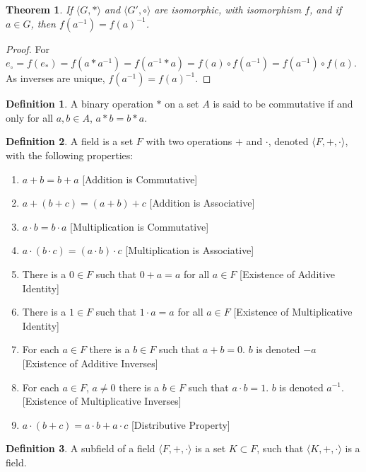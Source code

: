 \documentclass[oneside]{book}
\newtheorem{theorem}{Theorem}[section]
\theoremstyle{definition}
\newtheorem{definition}{Definition}[section]
\begin{document}
\begin{theorem}
If $\langle G, * \rangle$ and $\langle G', \circ \rangle$ are isomorphic, with isomorphism $f$, and if $a\in G$, then $f(a^{-1}) = f(a)^{-1}$.
\end{theorem}
\begin{proof}
For $e_{\circ}=f(e_*) = f(a*a^{-1}) = f(a^{-1}*a) = f(a)\circ f(a^{-1})=f(a^{-1})\circ f(a)$. As inverses are unique, $f(a^{-1})=f(a)^{-1}$.
\end{proof}

\begin{definition}
A binary operation $*$ on a set $A$ is said to be commutative if and only for all $a,b\in A$, $a*b = b*a$.
\end{definition}

\begin{definition}
A field is a set $F$ with two operations $+$ and $\cdot$, denoted $\langle F, +,\cdot \rangle$, with the following properties:
\begin{enumerate}
\item $a+b=b+a$ \hfill [Addition is Commutative]
\item $a+(b+c)=(a+b)+c$ \hfill [Addition is Associative]
\item $a\cdot b = b\cdot a$ \hfill [Multiplication is Commutative]
\item $a\cdot (b\cdot c) = (a\cdot b)\cdot c$ \hfill [Multiplication is Associative]
\item There is a $0\in F$ such that $0+a=a$ for all $a\in F$ \hfill [Existence of Additive Identity]
\item There is a $1\in F$ such that $1\cdot a = a$ for all $a\in F$ \hfill [Existence of Multiplicative Identity]
\item For each $a\in F$ there is a $b\in F$ such that $a+b = 0$. $b$ is denoted $-a$ \hfill [Existence of Additive Inverses]
\item For each $a\in F$, $a\ne 0$ there is a $b\in F$ such that $a\cdot b = 1$. $b$ is denoted $a^{-1}$. \hfill [Existence of Multiplicative Inverses]
\item $a\cdot(b+c) = a\cdot b + a\cdot c$ \hfill [Distributive Property]
\end{enumerate}
\end{definition}

\begin{definition}
A subfield of a field $\langle F,+,\cdot \rangle$ is a set $K\subset F$, such that $\langle K, +,\cdot \rangle$ is a field.
\end{definition}
\end{document}
